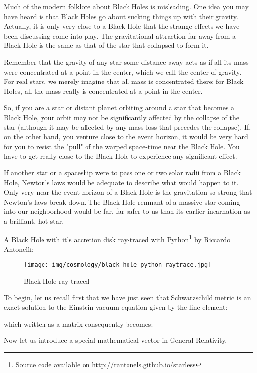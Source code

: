 	Much of the modern folklore about Black Holes is misleading. One idea you may have heard is that Black Holes go about sucking things up with their gravity. Actually, it is only very close to a Black Hole that the strange effects we have been discussing come into play. The gravitational attraction far away from a Black Hole is the same as that of the star that collapsed to form it.

	Remember that the gravity of any star some distance away acts as if all its mass were concentrated at a point in the center, which we call the center of gravity. For real stars, we merely imagine that all mass is concentrated there; for Black Holes, all the mass really is concentrated at a point in the center.

	So, if you are a star or distant planet orbiting around a star that becomes a Black Hole, your orbit may not be significantly affected by the collapse of the star (although it may be affected by any mass loss that precedes the collapse). If, on the other hand, you venture close to the event horizon, it would be very hard for you to resist the "pull" of the warped space-time near the Black Hole. You have to get really close to the Black Hole to experience any significant effect.

	If another star or a spaceship were to pass one or two solar radii from a Black Hole, Newton's laws would be adequate to describe what would happen to it. Only very near the event horizon of a Black Hole is the gravitation so strong that Newton's laws break down. The Black Hole remnant of a massive star coming into our neighborhood would be far, far safer to us than its earlier incarnation as a brilliant, hot star.

	A Black Hole with it's accretion disk ray-traced with Python\footnote{Source code available on  \url{http://rantonels.github.io/starless}} by  Riccardo Antonelli:
	\begin{figure}[H]
		\centering
		\texttt{[image: img/cosmology/black\_hole\_python\_raytrace.jpg]}
		\caption{Black Hole ray-traced }
	\end{figure}
	
	To begin, let us recall first that we have just seen that Schwarzschild metric is an exact solution to the Einstein vacuum equation given by the line element:
	
	which written as a matrix consequently becomes:
	
	Now let us introduce a special mathematical vector in General Relativity. 
	
